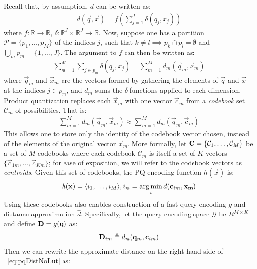 Recall that, by assumption, $d$ can be written as:
\begin{align*}
        d(\vec{q}, \vec{x}) = f(\sum_{j=1}^J \delta(q_j, x_j))
\end{align*}
where $f: \mathbb{R} \rightarrow \mathbb{R}$, $\delta: \mathbb{R}^J \times \mathbb{R}^J \rightarrow \mathbb{R}$. Now, suppose one has a partition $\mathcal{P} = \{p_1,\ldots,p_M \}$ of the indices $j$, such that $k \ne l \implies p_k \cap p_l = \emptyset$ and $\bigcup_m p_m = \{1,\ldots,J\}$. The argument to $f$ can then be written as:
\begin{align}
        \sum_{m=1}^M \sum_{j \in p_m} \delta(q_j, x_j)
            = \sum_{m=1}^M d_m(\vec{q}_m, \vec{x}_m)
\end{align}
where $\vec{q}_m$ and $\vec{x}_m$ are the vectors formed by gathering the elements of $\vec{q}$ and $\vec{x}$ at the indices $j \in p_m$, and $d_m$ sums the $\delta$ functions applied to each dimension. Product quantization replaces each $\vec{x}_m$ with one vector $\vec{c}_{m}$ from a \textit{codebook} set $\mathcal{C}_m$ of possibilities. That is: %
\begin{align} \label{eq:pqDistNoLut}
        \sum_{m=1}^M d_m(\vec{q}_m, \vec{x}_m) \approx \sum_{m=1}^M d_m(\vec{q}_m, \vec{c}_{m})
\end{align}
This allows one to store only the identity of the codebook vector chosen, instead of the elements of the original vector $\vec{x}_m$. More formally, let $\mathcal{\mathbf{C}} = \{\mathcal{C}_1,\ldots,\mathcal{C}_M\}$ be a set of $M$ codebooks where each codebook $\mathcal{C}_m $ is itself a set of $K$ vectors $\{\vec{c}_{1m},\ldots,\vec{c}_{Km}\}$; for ease of exposition, we will refer to the codebook vectors as \textit{centroids}. Given this set of codebooks, the PQ encoding function $h(\vec{x})$ is:
\begin{align}
    h(\mathbf{x}) = \langle i_1,\ldots,i_M \rangle,  i_m = \operatorname*{arg\,min}_i d(\mathbf{c}_{im}, \mathbf{x_m})
\end{align}
Using these codebooks also enables construction of a fast query encoding $g$ and distance approximation $\hat{d}$. Specifically, let the query encoding space $\mathcal{G}$ be $R^{M \times K}$ and define $\mathbf{D} = g(\mathbf{q})$ as: %
\begin{align}
    \mathbf{D}_{im} \triangleq d_m(\mathbf{q}_m, \mathbf{c}_{im})
\end{align}
Then we can rewrite the approximate distance on the right hand side of ~\ref{eq:pqDistNoLut} as:
